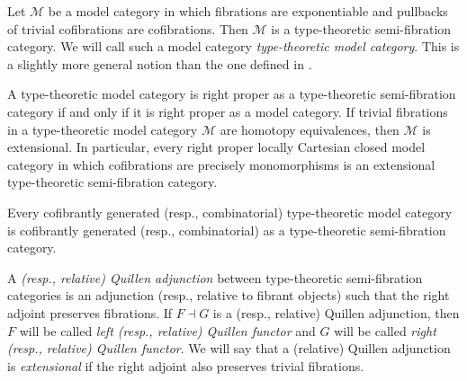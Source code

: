 \documentclass[reqno]{amsart}
\theoremstyle{definition}
\theoremstyle{remark}
\newcommand{\scat}[1]{\mathcal{#1}}
\numberwithin{figure}{section}
\begin{document}
\begin{example}
Let $\scat{M}$ be a model category in which fibrations are exponentiable and pullbacks of trivial cofibrations are cofibrations.
Then $\scat{M}$ is a type-theoretic semi-fibration category.
We will call such a model category \emph{type-theoretic model category}.
This is a slightly more general notion than the one defined in \cite[Definition~2.12]{shul-inv}.

A type-theoretic model category is right proper as a type-theoretic semi-fibration category if and only if it is right proper as a model category.
If trivial fibrations in a type-theoretic model category $\scat{M}$ are homotopy equivalences, then $\scat{M}$ is extensional.
In particular, every right proper locally Cartesian closed model category in which cofibrations are precisely monomorphisms is an extensional type-theoretic semi-fibration category.

Every cofibrantly generated (resp., combinatorial) type-theoretic model category is cofibrantly generated (resp., combinatorial) as a type-theoretic semi-fibration category.
\end{example}

\begin{defn}
A \emph{(resp., relative) Quillen adjunction} between type-theoretic semi-fibration categories is an adjunction (resp., relative to fibrant objects) such that the right adjoint preserves fibrations.
If $F \dashv G$ is a (resp., relative) Quillen adjunction, then $F$ will be called \emph{left (resp., relative) Quillen functor} and $G$ will be called \emph{right (resp., relative) Quillen functor}.
We will say that a (relative) Quillen adjunction is \emph{extensional} if the right adjoint also preserves trivial fibrations.
\end{defn}
\end{document}

